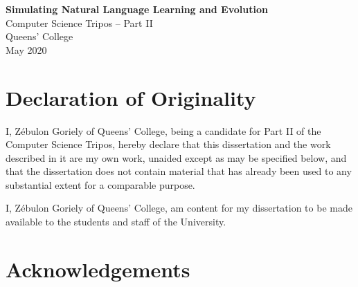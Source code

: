 \documentclass[12pt,a4paper]{report}
\begin{document}



\pagestyle{empty}

\vspace*{2mm}

\vspace*{60mm}
\begin{adjustwidth}{40pt}{40pt}
\begin{center}
\Huge
\textbf{Simulating Natural Language Learning and Evolution} \\[15mm]
\Large
Computer Science Tripos -- Part II \\[3mm]
Queens' College \\[3mm]
May 2020 \\[3mm]
\end{center}
\end{adjustwidth}


\pagestyle{plain}

\newpage
\section*{Declaration of Originality}

I, Z\'ebulon Goriely of Queens' College, being a candidate for Part II of the Computer
Science Tripos, hereby declare
that this dissertation and the work described in it are my own work,
unaided except as may be specified below, and that the dissertation
does not contain material that has already been used to any substantial
extent for a comparable purpose.

I, Z\'ebulon Goriely of Queens' College, am content for my dissertation to be made available to the students and staff of the University.

\bigskip
{}

\medskip
{}

\section*{Acknowledgements}
\end{document}
